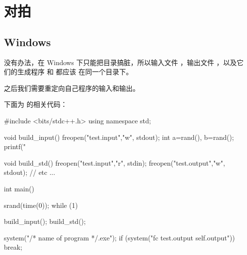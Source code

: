 
\section{对拍}
\subsection{Windows}
没有办法，在 Windows 下只能把目录搞脏，所以输入文件 ，输出文件
，以及它们的生成程序  和  都应该
在同一个目录下。

之后我们需要重定向自己程序的输入和输出。

下面为  的相关代码：
\begin{Cpp}
#include <bits/stdc++.h>
using namespace std;

void build_input(){
  freopen("test.input","w", stdout);
  int a=rand(), b=rand();
  printf("%
}

void build_std(){
  freopen("test.input","r", stdin);
  freopen("test.output","w", stdout);
  // etc ...
}

int main(){
  srand(time(0));
  while (1){
    build_input();
    build_std();

    system("/* name of program */.exe");
    if (system("fc test.output self.output"))
      break;
  }
}
\end{Cpp}


